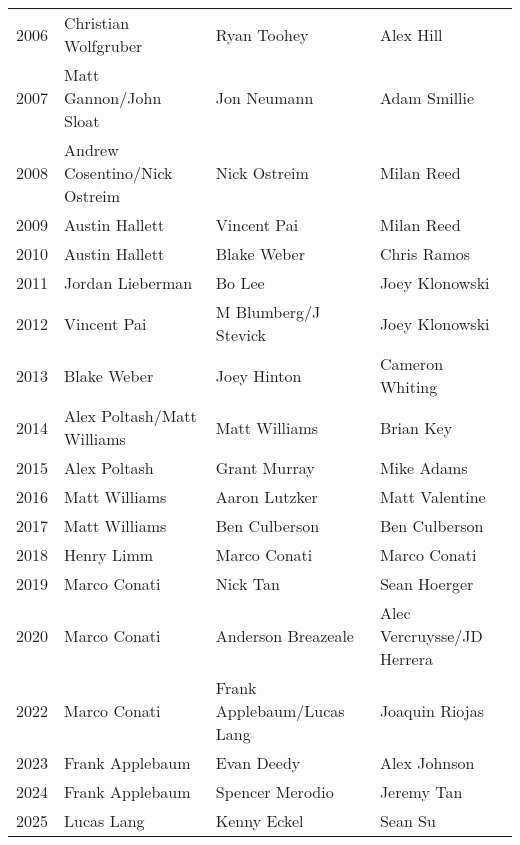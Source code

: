 \begin{table}[htbp]
\begin{tabular}{clll}
        2006 & Christian Wolfgruber & Ryan Toohey & Alex Hill \\
        2007 & Matt Gannon/John Sloat & Jon Neumann & Adam Smillie \\
        2008 & Andrew Cosentino/Nick Ostreim & Nick Ostreim & Milan Reed \\
        2009 & Austin Hallett & Vincent Pai & Milan Reed \\
        2010 & Austin Hallett & Blake Weber & Chris Ramos \\
        2011 & Jordan Lieberman & Bo Lee & Joey Klonowski \\
        2012 & Vincent Pai & M Blumberg/J Stevick & Joey Klonowski \\
        2013 & Blake Weber & Joey Hinton & Cameron Whiting \\
        2014 & Alex Poltash/Matt Williams & Matt Williams & Brian Key \\
        2015 & Alex Poltash & Grant Murray & Mike Adams \\
        2016 & Matt Williams & Aaron Lutzker & Matt Valentine \\
        2017 & Matt Williams & Ben Culberson & Ben Culberson \\
        2018 & Henry Limm & Marco Conati & Marco Conati \\
        2019 & Marco Conati & Nick Tan & Sean Hoerger \\
        2020 & Marco Conati & Anderson Breazeale & Alec Vercruysse/JD Herrera \\
        2022 & Marco Conati & Frank Applebaum/Lucas Lang & Joaquin Riojas \\
        2023 & Frank Applebaum & Evan Deedy & Alex Johnson \\
        2024 & Frank Applebaum & Spencer Merodio & Jeremy Tan \\
        2025 & Lucas Lang & Kenny Eckel & Sean Su \\
        \bottomrule
        \end{tabular}
        \end{table}
        
